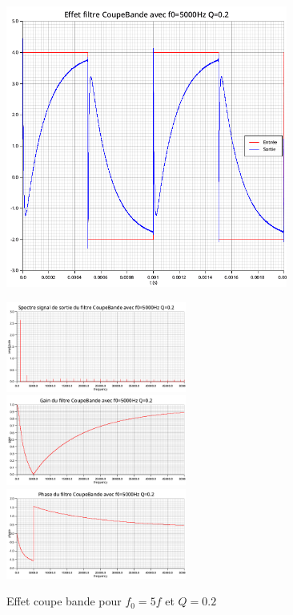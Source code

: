 \documentclass{article}
\begin{document}
\begin{figure}[H]
  \begin{minipage}{0.6\textwidth}
      \centering
      \includegraphics[width=25em]{images/creneau/rejecteur/q=0.2/5/signals.png}
  \end{minipage}
  \begin{minipage}{0.3\textwidth}
      \centering
      \includegraphics[width=16em]{images/creneau/rejecteur/q=0.2/5/fft_out.png}
      \vfill
      \includegraphics[width=16em]{images/creneau/rejecteur/q=0.2/5/gain.png}
      \vfill
      \includegraphics[width=16em]{images/creneau/rejecteur/q=0.2/5/phase.png}
  \end{minipage}
  \caption{Effet coupe bande pour $f_0=5f$ et $Q=0.2$}
\end{figure}
\end{document}
